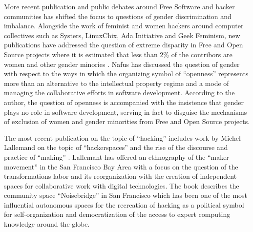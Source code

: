 \documentclass[10pt,letter,oneside]{scrartcl}
\begin{document}
More recent publication and public debates around Free Software and hacker
communities has shifted the focus to questions of gender discrimination and
imbalance.  Alongside the work of feminist and women hackers around computer
collectives such as Systers, LinuxChix, Ada Initiative and Geek Feminism, new
publications have addressed the question of extreme disparity in Free and Open
Source projects where it is estimated that less than 2\% of the contribors are
women and other gender minories \parencite{ghosh_understanding_2005}.  Nafus
\cite*{nafus_patches_2012} has discussed the question of gender with respect to
the ways in which the organizing symbol of ``openness'' represents more than an
alternative to the intellectual property regime and a mode of managing the
collaborative efforts in software development.  According to the author, the
question of openness is accompanied with the insistence that gender plays no
role in software development, serving in fact to disguise the mechanisms of
exclusion of women and gender minorities from Free and Open Source projects.


The most recent publication on the topic of ``hacking'' includes work by Michel
Lallemand on the topic of ``hackerspaces'' and the rise of the discourse and
practice of ``making'' \parencite{lallement}.  Lallemant has offered an ethnography
of the ``maker movement'' in the San Francisco Bay Area with a focus on the
question of the transformations labor and its reorganization with the creation
of independent spaces for collaborative work with digital technologies. The book
describes the community space ``Noisebridge'' in San Francisco which has been
one of the most influential autonomous spaces for the recreation of hacking as a
political symbol for self-organization and democratization of the access to
expert computing knowledge around the globe.
\end{document}
